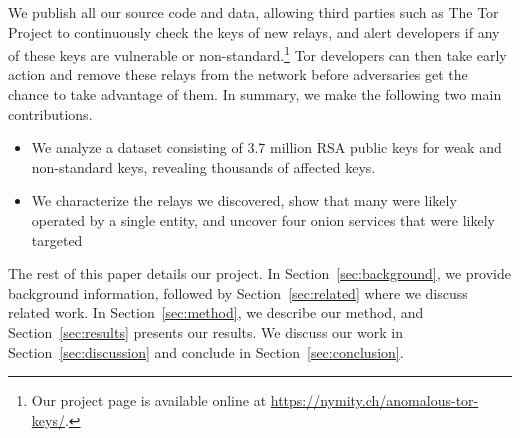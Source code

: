 We publish all our source code and data, allowing third parties such as The Tor
Project to continuously check the keys of new relays, and alert developers if
any of these keys are vulnerable or non-standard.\footnote{Our project page is
available online at \url{https://nymity.ch/anomalous-tor-keys/}.}  Tor
developers can then take early action and remove these relays from the network
before adversaries get the chance to take advantage of them.  In summary, we
make the following two main contributions.
\begin{itemize}
	\item We analyze a dataset consisting of 3.7 million RSA public keys for
		weak and non-standard keys, revealing thousands of affected keys.

	\item We characterize the relays we discovered, show that many were
		likely operated by a single entity, and uncover four onion services that
		were likely targeted
\end{itemize}

The rest of this paper details our project.  In Section~\ref{sec:background}, we
provide background information, followed by Section~\ref{sec:related} where we 
discuss related work.  In Section~\ref{sec:method}, we describe our method,
and Section~\ref{sec:results} presents our results.  We discuss our work in
Section~\ref{sec:discussion} and conclude in Section~\ref{sec:conclusion}.
